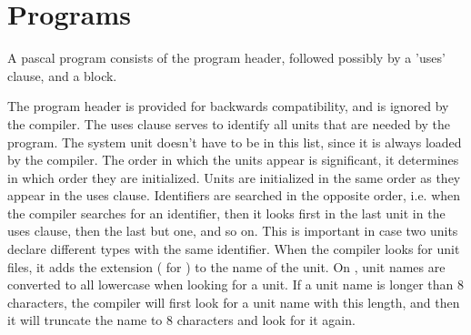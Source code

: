 \documentclass{report}
\begin{document}
\section{Programs}
A pascal program consists of the program header, followed possibly by a
'uses' clause, and a block.

The program header is provided for backwards compatibility, and is ignored
by the compiler.
The uses clause serves to identify all units that are needed by the program.
The system unit doesn't have to be in this list, since it is always loaded
by the compiler.
The order in which the units appear is significant, it determines in
which order they are initialized. Units are initialized in the same order
as they appear in the uses clause. Identifiers are searched in the opposite
order, i.e. when the compiler searches for an identifier, then it looks
first in the last unit in the uses clause, then the last but one, and so on.
This is important in case two units declare different types with the same
identifier.
When the compiler looks for unit files, it adds the extension 
( for \windowsnt) to the name of the unit. On \linux, unit names
are converted to all lowercase when looking for a unit.
If a unit name is longer than 8 characters, the compiler will first look for
a unit name with this length, and then it will truncate the name to 8
characters and look for it again.
\end{document}

